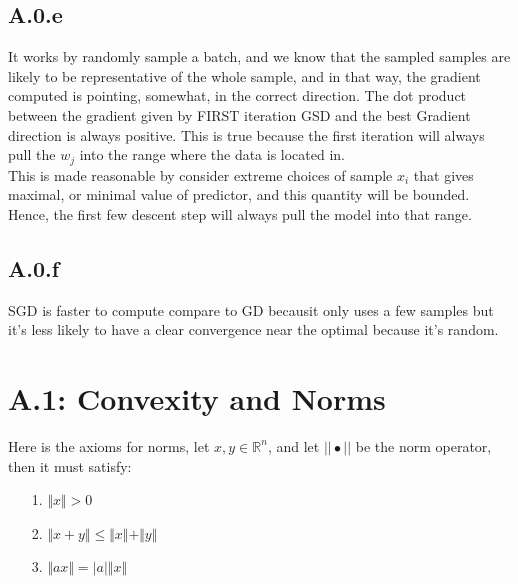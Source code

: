 \documentclass[]{article}
\begin{document}
    \subsection*{A.0.e}
        It works by randomly sample a batch, and we know that the sampled samples are likely to be representative of the whole sample, and in that way, the gradient computed is pointing, somewhat, in the correct direction. The dot product between the gradient given by FIRST iteration GSD and the best Gradient direction is always positive. This is true because the first iteration will always pull the $w_j$ into the range where the data is located in. 
        \\
        This is made reasonable by consider extreme choices of sample $x_i$ that gives maximal, or minimal value of predictor, and this quantity will be bounded. Hence, the first few descent step will always pull the model into that range. 
    \subsection*{A.0.f}
        SGD is faster to compute compare to GD becausit only uses a few samples but it's less likely to have a clear convergence near the optimal because it's random. 
    

\section*{A.1: Convexity and Norms}
    Here is the axioms for norms, let $x, y\in \mathbb{R}^n$, and let $||\bullet||$ be the norm operator, then it must satisfy: 
    \begin{enumerate}
    \item[1.] $\Vert x\Vert > 0$
    \item[2.] $\Vert x + y\Vert \le \Vert x\Vert + \Vert y\Vert$ 
    \item[3.] $\Vert a x\Vert = |a|\Vert x\Vert$ 
    \end{enumerate}
\end{document}
